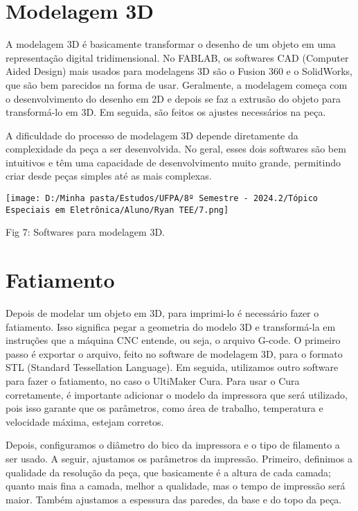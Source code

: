 \documentclass[
]{book}
\begin{document}
\section{Modelagem 3D}\label{modelagem-3d}

A modelagem 3D é basicamente transformar o desenho de um objeto em uma representação digital tridimensional. No FABLAB, os softwares CAD (Computer Aided Design) mais usados para modelagens 3D são o Fusion 360 e o SolidWorks, que são bem parecidos na forma de usar. Geralmente, a modelagem começa com o desenvolvimento do desenho em 2D e depois se faz a extrusão do objeto para transformá-lo em 3D. Em seguida, são feitos os ajustes necessários na peça.

A dificuldade do processo de modelagem 3D depende diretamente da complexidade da peça a ser desenvolvida. No geral, esses dois softwares são bem intuitivos e têm uma capacidade de desenvolvimento muito grande, permitindo criar desde peças simples até as mais complexas.

\texttt{[image: D:/Minha pasta/Estudos/UFPA/8º Semestre - 2024.2/Tópico Especiais em Eletrônica/Aluno/Ryan TEE/7.png]}

Fig 7: Softwares para modelagem 3D.

\section{Fatiamento}\label{fatiamento}

Depois de modelar um objeto em 3D, para imprimi-lo é necessário fazer o fatiamento. Isso significa pegar a geometria do modelo 3D e transformá-la em instruções que a máquina CNC entende, ou seja, o arquivo G-code. O primeiro passo é exportar o arquivo, feito no software de modelagem 3D, para o formato STL (Standard Tessellation Language). Em seguida, utilizamos outro software para fazer o fatiamento, no caso o UltiMaker Cura. Para usar o Cura corretamente, é importante adicionar o modelo da impressora que será utilizado, pois isso garante que os parâmetros, como área de trabalho, temperatura e velocidade máxima, estejam corretos.

Depois, configuramos o diâmetro do bico da impressora e o tipo de filamento a ser usado. A seguir, ajustamos os parâmetros da impressão. Primeiro, definimos a qualidade da resolução da peça, que basicamente é a altura de cada camada; quanto mais fina a camada, melhor a qualidade, mas o tempo de impressão será maior. Também ajustamos a espessura das paredes, da base e do topo da peça.
\end{document}
